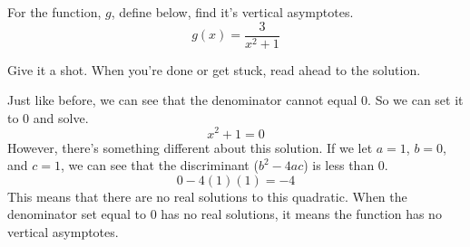 \begin{problem}
    For the function, $g$, define below, find it's vertical asymptotes.
    \[
        g(x) = \frac{3}{x^2 + 1}
    \]
\end{problem}
Give it a shot. When you're done or get stuck, read ahead to the solution.
\begin{solution}
    Just like before, we can see that the denominator cannot equal $0$. So we can set it to $0$ and solve.
    \[
    x^2 + 1 = 0
    \]
    However, there's something different about this solution. If we let $a = 1$, $b = 0$, and $c = 1$, we can see that the discriminant ($b^2 - 4ac$) is less than $0$.
    \[
        0 - 4(1)(1) = -4
    \]
    This means that there are no real solutions to this quadratic. When the denominator set equal to $0$ has no real solutions, it means the function has no vertical asymptotes.

    \begin{center}
    \end{center}
\end{solution}